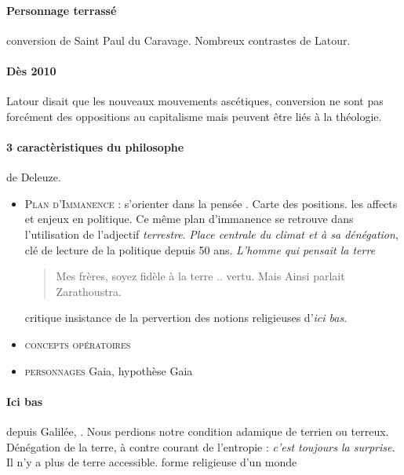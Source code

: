 \paragraph{Personnage terrassé } conversion de Saint Paul du Caravage. Nombreux contrastes de Latour. 

\paragraph{Dès 2010} Latour disait que les nouveaux mouvements ascétiques, conversion ne sont pas forcément des oppositions au capitalisme mais peuvent être liés à la théologie. 

\paragraph{3 caractèristiques du philosophe} de Deleuze. 
\begin{itemize}
    \item \textsc{Plan d'Immanence} : s'orienter dans la pensée . Carte des positions. les affects et enjeux en politique. Ce même plan d'immanence se retrouve dans l'utilisation de l'adjectif \textit{terrestre}.  \textit{Place centrale du climat et à sa dénégation}, clé de lecture de la politique depuis 50 ans. \textit{L'homme qui pensait la terre}
    \begin{quote}
        Mes frères, soyez fidèle à la terre .. vertu. 
        Mais
        Ainsi parlait Zarathoustra.
    \end{quote}
    critique insistance de la pervertion des notions religieuses d'\textit{ici bas}. 
    \item \textsc{concepts opératoires}
    \item \textsc{personnages} Gaia, hypothèse Gaia 
\end{itemize}

\paragraph{Ici bas} depuis Galilée, . Nous perdions notre condition adamique de terrien ou terreux. Dénégation de la terre, à contre courant de l'entropie : \textit{c'est toujours la surprise}. Il n'y a plus de terre accessible. forme religieuse d'un monde 

